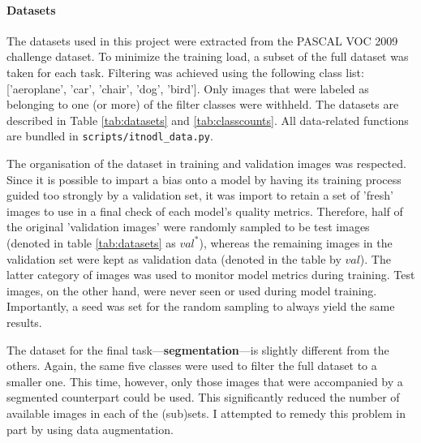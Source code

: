 \paragraph{Datasets} The datasets used in this project were extracted from the PASCAL VOC 2009 challenge dataset. To minimize the training load, a subset of the full dataset was taken for each task. Filtering was achieved using the following class list: ['aeroplane', 'car', 'chair', 'dog', 'bird']. Only images that were labeled as belonging to one (or more) of the filter classes were withheld. The datasets are described in Table \ref{tab:datasets} and \ref{tab:classcounts}. All data-related functions are bundled in \texttt{scripts/itnodl\_data.py}.


The organisation of the dataset in training and validation images was respected. Since it is possible to impart a bias onto a model by having its training process guided too strongly by a validation set, it was import to retain a set of 'fresh' images to use in a final check of each model's quality metrics. Therefore, half of the original 'validation images' were randomly sampled to be test images (denoted in table \ref{tab:datasets} as $val^\ast$), whereas the remaining images in the validation set were kept as validation data (denoted in the table by $val$). The latter category of images was used to monitor model metrics during training. Test images, on the other hand, were never seen or used during model training. Importantly, a seed was set for the random sampling to always yield the same results.
 
The dataset for the final task---\textbf{segmentation}---is slightly different from the others. Again, the same five classes were used to filter the full dataset to a smaller one. This time, however, only those images that were accompanied by a segmented counterpart could be used. This significantly reduced the number of available images in each of the (sub)sets. I attempted to remedy this problem in part by using data augmentation.


